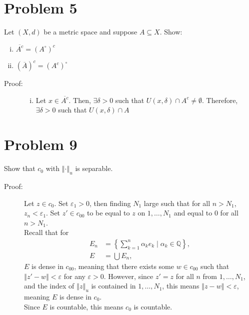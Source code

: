 \documentclass[8pt]{extarticle}
\newcommand{\Q}{\mathbb{Q}}
\newcommand{\norm}[1]{\left\Vert #1\right\Vert}
\begin{document}
  \section{Problem 5}%
  Let $(X,d)$ be a metric space and suppose $A\subseteq X$. Show:
  \begin{enumerate}[(i)]
    \item $\overline{A^c} = (A^{\circ})^{c}$
    \item $(\overline{A})^{c} = (A^{c})^{\circ}$
  \end{enumerate}
  \begin{description}
    \item[Proof:]\hfill
      \begin{enumerate}[(i)]
        \item Let $x\in \overline{A^{c}}$. Then, $\exists \delta > 0 $ such that $U(x,\delta)\cap A^{c} \neq \emptyset$. Therefore, $\exists \delta > 0$ such that $U(x,\delta)\cap A$
      \end{enumerate}
  \end{description}
  \section{Problem 9}%
  Show that $c_0$ with $\norm{\cdot}_u$ is separable.
  \begin{description}
    \item[Proof:] Let $z\in c_0$. Set $\varepsilon_1 > 0$, then finding $N_1$ large such that for all $n > N_1$, $z_n < \varepsilon_1$. Set $z'\in c_{00}$ to be equal to $z$ on $1,\dots,N_1$ and equal to $0$ for all $n > N_1$.\\

      Recall that for
      \begin{align*}
        E_n &= \left\{\sum_{k=1}^{n}\alpha_ke_k\mid \alpha_k\in \Q\right\},\\
        E &= \bigcup E_n,
      \end{align*}
      $E$ is dense in $c_{00}$, meaning that there exists some  $w\in c_{00}$ such that $\norm{z'-w} < \varepsilon$ for any $\varepsilon > 0$. However, since $z' = z$ for all $n$ from $1,\dots,N_1$, and the index of $\norm{z}_{u}$ is contained in $1,\dots,N_1$, this means $\norm{z-w} < \varepsilon$, meaning $E$ is dense in $c_{0}$.\\

      Since $E$ is countable, this means $c_0$ is countable.
  \end{description}
\end{document}
